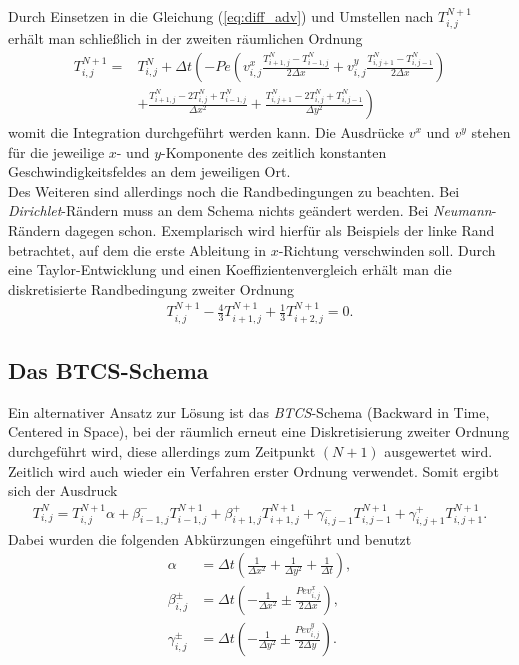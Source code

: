 \documentclass[12pt,a4paper,titlepage,headinclude,bibtotoc]{scrartcl}
\begin{document}
Durch Einsetzen in die Gleichung (\ref{eq:diff_adv}) und Umstellen nach $T_{i,j}^{N+1}$ erhält man schließlich in der zweiten räumlichen Ordnung
\begin{align}
\label{eq:ftcs}
T_{i,j}^{N+1} = &T_{i,j}^N + \Delta t \left( -Pe \left( v^x_{i,j} \frac{T_{i+1,j}^N-T_{i-1,j}^N}{2\Delta x}+v^y_{i,j} \frac{T_{i,j+1}^N-T_{i,j-1}^N}{2\Delta x} \right) \right. \nonumber \\ 
 & \left.+ \frac{ T_{i+1,j}^N - 2 T_{i,j}^N +  T_{i-1,j}^N }{\Delta x^2} 
+ \frac{ T_{i,j+1}^N - 2  T_{i,j}^N + T_{i,j-1}^N}{\Delta y^2} \right) 
\end{align}
womit die Integration durchgeführt werden kann. Die Ausdrücke $v^x$ und $v^y$ stehen für die jeweilige $x$- und $y$-Komponente des zeitlich konstanten Geschwindigkeitsfeldes an dem jeweiligen Ort.\\
Des Weiteren sind allerdings noch die Randbedingungen zu beachten. Bei \textit{Dirichlet}-Rändern muss an dem Schema nichts geändert werden. Bei \textit{Neumann}-Rändern dagegen schon. Exemplarisch wird hierfür als Beispiels der linke Rand betrachtet, auf dem die erste Ableitung in $x$-Richtung verschwinden soll. Durch eine Taylor-Entwicklung und einen Koeffizientenvergleich erhält man die diskretisierte Randbedingung zweiter Ordnung
\begin{align*}
T_{i,j}^{N+1} - \frac{4}{3} T_{i+1,j}^{N+1} + \frac{1}{3} T_{i+2,j}^{N+1} = 0.
\end{align*}


\subsection{Das BTCS-Schema}
\label{sec:btcs}
Ein alternativer Ansatz zur Lösung ist das \textit{BTCS}-Schema (Backward in Time, Centered in Space), bei der räumlich erneut eine Diskretisierung zweiter Ordnung durchgeführt wird, diese allerdings zum Zeitpunkt $(N+1)$ ausgewertet wird. Zeitlich wird auch wieder ein Verfahren erster Ordnung verwendet.
Somit ergibt sich der Ausdruck
\begin{align}
\label{eq:impli}
T_{i,j}^{N} = T_{i,j}^{N+1} \alpha + \beta^-_{i-1,j} T_{i-1,j}^{N+1} + \beta^+_{i+1,j} T_{i+1,j}^{N+1} + \gamma^-_{i,j-1} T_{i,j-1}^{N+1} + \gamma^+_{i,j+1} T_{i,j+1}^{N+1}.
\end{align}
Dabei wurden die folgenden Abkürzungen eingeführt und benutzt
\begin{align}
\alpha &= \Delta t \left(\frac{1}{\Delta x^2} + \frac{1}{\Delta y^2} + \frac{1}{\Delta t} \right), \\
\beta^\pm_{i,j} &= \Delta t \left(-\frac{1}{\Delta x^2} \pm \frac{Pe v^x_{i,j}}{2 \Delta x}\right), \\
\gamma^\pm_{i,j} &= \Delta t \left(-\frac{1}{\Delta y^2} \pm \frac{Pe v^y_{i,j}}{2 \Delta y}\right).
\end{align}
\end{document}
